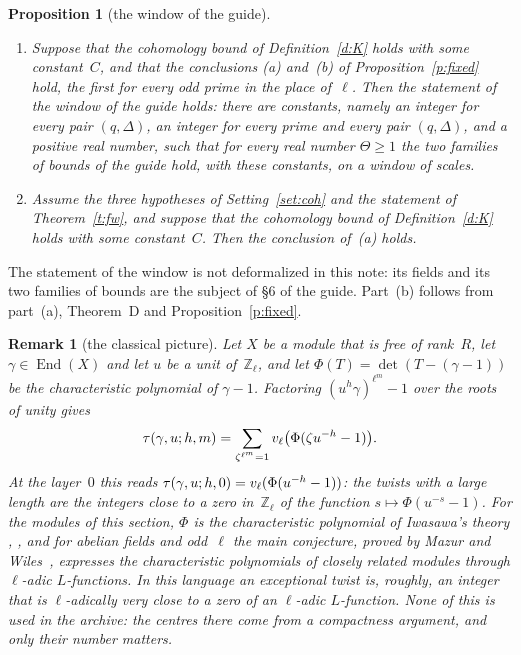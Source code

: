 \documentclass[11pt,a4paper]{article}
\makeatletter
\newcommand{\lean}[1]{\csname LN@#1\endcsname}
\newcommand{\Z}{\mathbb{Z}}
\newcommand{\End}{\operatorname{End}}
\newcommand{\m}[1]{\mbox{$#1$}}        %
\newcommand{\leantag}{{\sffamily\bfseries\fontsize{6.3}{8}\selectfont\color{leancol}\addfontfeatures{LetterSpace=7}LEAN}}
\newcommand{\sep}{\unskip\nobreak\hspace{5pt}{\color{inkfaint}\textperiodcentered}\hspace{5pt plus 2pt}\ignorespaces}
\newcommand{\leanline}[1]{\par\nopagebreak\vspace{-2.5pt}{\fontsize{8.9}{12.4}\selectfont\color{inksoft}\raggedright
  \noindent\llap{\leantag\hspace{9pt}}#1\par}\vspace{1pt}}
\theoremstyle{plainx}
\newtheorem{proposition}[theorem]{Proposition}
\theoremstyle{uprightx}
\newtheorem{remark}[theorem]{Remark}
\makeatother
\begin{document}
\begin{proposition}[the window of the guide]\label{p:window}
\begin{enumerate}[label=\textup{(\alph*)},topsep=2pt,itemsep=1pt]
\item Suppose that the cohomology bound of Definition~\ref{d:K} holds with some constant~$C$, and that the
conclusions (a) and~(b) of Proposition~\ref{p:fixed} hold, the first for every odd prime in the place of~$\ell$.
Then the statement of the window of the guide \cite[§6]{Gu} holds: there are constants, namely an integer for
every pair $(q,\Delta)$, an integer for every prime and every pair $(q,\Delta)$, and a positive real number, such
that for every real number \m{\Theta\ge1} the two families of bounds of the guide hold, with these constants, on a
window of scales.
\item Assume the three hypotheses of Setting~\ref{set:coh} and the statement of Theorem~\ref{t:fw}, and suppose that
the cohomology bound of Definition~\ref{d:K} holds with some constant~$C$. Then the conclusion of~(a) holds.
\end{enumerate}
\end{proposition}
\leanline{(a) \lean{thmBab}\sep (b) \lean{thmBabK}}

The statement of the window is not deformalized in this note: its fields and its two families of bounds are the
subject of §6 of the guide. Part~(b) follows from part~(a), Theorem~D and Proposition~\ref{p:fixed}.
\begin{remark}[the classical picture]\label{r:classical}
Let $X$ be a module that is free of rank~$R$, let \m{\gamma\in\End(X)} and let $u$ be a unit of~$\Z_\ell$, and let
\m{\Phi(T)=\det(T-(\gamma-1))} be the characteristic polynomial of \m{\gamma-1}. Factoring \m{(u^h\gamma)^{\ell^m}-1} over the roots of unity gives
\[
\tau(\gamma,u;h,m)=\sum_{\zeta^{\ell^m}=1}v_{\ell}\bigl(\Phi(\zeta u^{-h}-1)\bigr).
\]
At the layer~$0$ this reads \m{\tw{\gamma}{u}{h}{0}=\vl{\ell}{\Phi(u^{-h}-1)}}: the twists with a large length are the integers
close to a zero in~$\Z_\ell$ of the function \m{s\mapsto\Phi(u^{-s}-1)}. For the modules of this section, $\Phi$ is
the characteristic polynomial of Iwasawa's theory \cite{Iw}, \cite[Ch.\,13]{Wa}, and for abelian fields and odd~$\ell$
the main conjecture, proved by Mazur and Wiles~\cite{MW}, expresses the characteristic polynomials of closely related
modules through $\ell$-adic $L$-functions. In this language an exceptional twist is, roughly, an integer that is
$\ell$-adically very close to a zero of an $\ell$-adic $L$-function. None of this is used in the archive: the
centres there come from a compactness argument, and only their number matters.
\end{remark}
\end{document}
